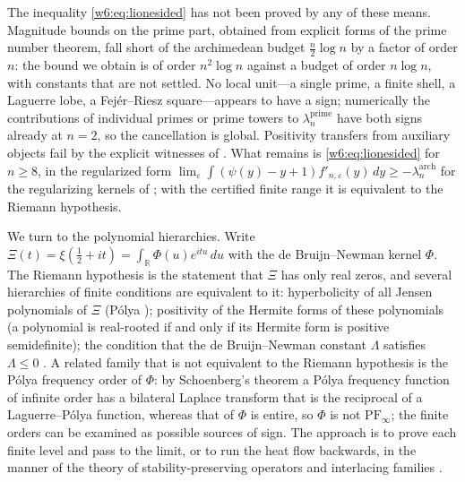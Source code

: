 \documentclass[11pt]{amsart}
\theoremstyle{definition}
\theoremstyle{remark}
\numberwithin{equation}{section}
\newcommand{\R}{\mathbb{R}}
\begin{document}
The inequality \eqref{w6:eq:lionesided} has not been proved by any of these means. Magnitude bounds
on the prime part, obtained from explicit forms of the prime number theorem, fall short of the
archimedean budget $\frac n2\log n$ by a factor of order $n$: the bound we obtain is of order
$n^2\log n$ against a budget of order $n\log n$, with constants that are not settled. No local
unit---a single prime, a finite shell, a Laguerre lobe, a Fej\'er--Riesz square---appears to have a
sign; numerically the contributions of individual primes or prime towers to
$\lambda_n^{\mathrm{prime}}$ have both signs already at $n=2$, so the cancellation is global.
Positivity transfers from auxiliary objects fail by the explicit witnesses of \cite{P37}. What
remains is \eqref{w6:eq:lionesided} for $n\ge8$, in the regularized form
$\lim_\varepsilon\int(\psi(y)-y+1)f'_{n,\varepsilon}(y)\,dy\ge-\lambda_n^{\mathrm{arch}}$ for the
regularizing kernels of \cite{P36}; with the certified finite range it is equivalent to the
Riemann hypothesis.

\label{w6:fam:R14}
We turn to the polynomial hierarchies. Write $\Xi(t)=\xi(\frac12+it)=\int_\R\Phi(u)e^{itu}\,du$
with the de Bruijn--Newman kernel $\Phi$. The Riemann hypothesis is the statement that $\Xi$ has
only real zeros, and several hierarchies of finite conditions are equivalent to it: hyperbolicity
of all Jensen polynomials of $\Xi$ (P\'olya \cite{Polya1927}); positivity of the Hermite forms of
these polynomials (a polynomial is real-rooted if and only if its Hermite form is positive
semidefinite); the condition that the de Bruijn--Newman constant $\Lambda$ satisfies $\Lambda\le0$
\cite{deBruijn1950,Newman1976}. A related family that is not equivalent to the Riemann hypothesis
is the P\'olya frequency order of $\Phi$: by Schoenberg's theorem \cite{Schoenberg1951} a P\'olya
frequency function of infinite order has a bilateral Laplace transform that is the reciprocal of a
Laguerre--P\'olya function, whereas that of $\Phi$ is entire, so $\Phi$ is not
$\mathrm{PF}_\infty$; the finite orders can be examined as possible sources of sign. The approach
is to prove each finite level and pass to the limit, or to run the heat flow backwards, in the
manner of the theory of stability-preserving operators and interlacing families
\cite{BorceaBranden2009,MSS2015}.
\end{document}
